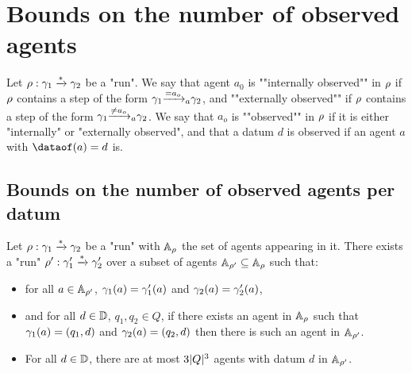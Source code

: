 \section{Bounds on the number of observed agents}
\label{sec:bounds-observed-agents}

\begin{definition}
	Let $\run : \config_1 \xrightarrow{*} \config_2$ be a "run".
	We say that agent $a_0$ is ""internally observed"" in $\run$ if $\run$ contains a step of the form $\config_1 \step{=}{a}{a_o} \config_2$, and ""externally observed"" if $\run$ contains a step of the form $\config_1 \step{\neq}{a}{a_o} \config_2$.
	We say that $a_o$ is ""observed"" in $\run$ if it is either "internally" or "externally observed", and that a datum $d$ is observed if an agent $a$ with $\dataof(a) =d$ is. 
\end{definition}

\subsection{Bounds on the number of observed agents per datum}

\begin{lemma}
	\label{lem:agents-core-lemma}
	Let $\run : \config_1 \xrightarrow{*} \config_2$ be a "run" with $\Agentset_{\run}$ the set of agents appearing in it. There exists a "run" $\run' : \config'_1 \xrightarrow{*} \config'_2$ over a subset of agents $\Agentset_{\run'} \subseteq \Agentset_{\run}$ such that:
	\begin{itemize}
		\item for all $a \in \Agentset_{\run'}$, $\config_1(a) = \config'_1(a)$ and $\config_2(a) = \config'_2(a)$,
		
		\item and for all $d \in \Dataset$, $q_1, q_2 \in Q$, if there exists an agent in $\Agentset_{\run}$ such that $\config_1(a) = (q_1, d)$ and $\config_2(a) = (q_2, d)$ then there is such an agent in $\Agentset_{\run'}$.
		
		\item For all $d \in \Dataset$, there are at most $3\size{Q}^3$ agents with datum $d$ in $\Agentset_{\run'}$.
	\end{itemize}
\end{lemma}

